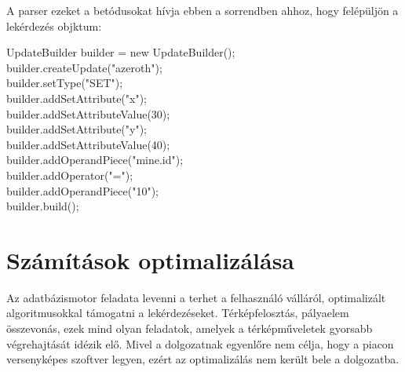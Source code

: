 A parser ezeket a betódusokat hívja ebben a sorrendben ahhoz, hogy felépüljön a lekérdezés objktum:

UpdateBuilder builder = new UpdateBuilder(); \\
builder.createUpdate("azeroth"); \\
builder.setType("SET"); \\
builder.addSetAttribute("x"); \\
builder.addSetAttributeValue(30); \\
builder.addSetAttribute("y"); \\
builder.addSetAttributeValue(40); \\
builder.addOperandPiece("mine.id"); \\
builder.addOperator("="); \\
builder.addOperandPiece("10"); \\
builder.build(); \\





\section{Számítások optimalizálása}

Az adatbázismotor feladata levenni a terhet a felhasználó válláról, 
optimalizált algoritmusokkal támogatni a lekérdezéseket. Térképfelosztás, pályaelem összevonás, ezek mind olyan feladatok,
amelyek a térképműveletek gyorsabb végrehajtását idézik elő.
Mivel a dolgozatnak egyenlőre nem célja, hogy a piacon versenyképes szoftver legyen, ezért az optimalizálás nem került bele a dolgozatba.


